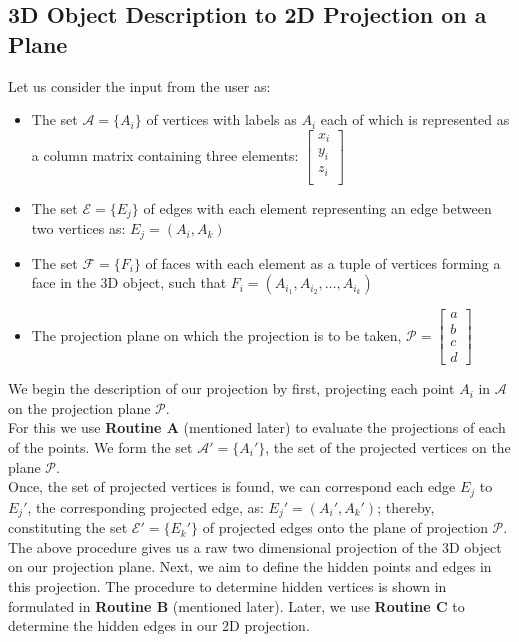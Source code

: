 \documentclass[12pt]{report}
\begin{document}
\subsection*{3D Object Description to 2D Projection on a Plane}
Let us consider the input from the user as:
\begin{itemize}[nolistsep,noitemsep]
\item The set \(\mathcal{A} = \{A_{i}\} \) of vertices with labels as \(A_{i}\) each of which is represented as a column matrix containing three elements: \(\begin{bmatrix} x_{i} \\ y_{i} \\ z_{i} \\ \end{bmatrix}\)  
\item The set \(\mathcal{E} = \{E_{j}\} \) of edges with each element representing an edge between two vertices as: \(E_{j} = (A_{i},A_{k}) \)
\item The set \(\mathcal{F} = \{F_{i}\} \) of faces with each element as a tuple of vertices forming a face in the 3D object, such that \(F_{i} = (A_{i_{1}},A_{i_{2}}, \dots, A_{i_{k}}) \)
\item The projection plane on which the projection is to be taken, \(\mathcal{P} = \begin{bmatrix}
a \\ b \\ c \\ d \end{bmatrix} \)
\end{itemize}
We begin the description of our projection by first, projecting each point \(A_{i} \) in \(\mathcal{A} \) on the projection plane \(\mathcal{P} \). \\
For this we use \textbf{Routine A} (mentioned later) to evaluate the projections of each of the points. We form the set \(\mathcal{A'} = \{A_{i}'\} \), the set of the projected vertices on the plane \(\mathcal{P} \). \\
Once, the set of projected vertices is found, we can correspond each edge \(E_{j}\) to \(E_{j}'\), the corresponding projected edge, as: \(E_{j}' = (A_{i}',A_{k}') \); thereby, constituting the set \( \mathcal{E'} = \{E_{k}'\} \) of projected edges onto the plane of projection \(\mathcal{P} \). \\
The above procedure gives us a raw two dimensional projection of the 3D object on our projection plane. Next, we aim to define the hidden points and edges in this projection. The procedure to determine hidden vertices is shown in formulated in \textbf{Routine B} (mentioned later). Later, we use \textbf{Routine C} to determine the hidden edges in our 2D projection.
\end{document}
